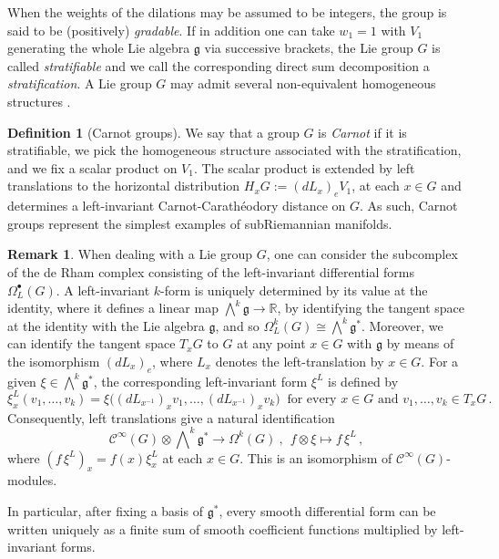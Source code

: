 \documentclass[dvipsnames]{amsart}
\theoremstyle{definition}
\newtheorem{definition}[theorem]{Definition}
\newtheorem{remark}[theorem]{Remark}
\theoremstyle{definition}
\numberwithin{equation}{section}
\newcommand{\R}{\mathbb{R}}
\begin{document}
    When the weights of the dilations may be assumed to be integers, the group is said to be (positively) \textit{gradable}. If in addition one can take $w_1=1$ with $V_{1}$  generating the whole Lie algebra $\mathfrak{g}$ via successive brackets, the Lie group $G$ is called \textit{stratifiable} and we call the corresponding direct sum decomposition a \textit{stratification}. A Lie group $G$ may admit several non-equivalent homogeneous structures \cite{hakavuori2022gradings}.
    \begin{definition}[Carnot groups]\label{def: carnot group}
    We say that a group $G$ is \textit{Carnot} if it is stratifiable, we pick the homogeneous structure associated with the stratification, and we fix a scalar product on $V_1$. The scalar
product is extended by left translations to the horizontal
distribution $H_xG:=(dL_x)_eV_1$, at each $x\in G$
and determines a left-invariant Carnot-Carath\'eodory distance on \(G\). As such, Carnot groups represent the simplest examples of subRiemannian manifolds.
\end{definition}
    \begin{remark}
        When dealing with a Lie group $G$, one can consider the subcomplex of the de Rham complex consisting of the left-invariant differential forms $\Omega_L^\bullet(G)$. A left-invariant $k$-form is uniquely determined by its value at the identity, where it defines a linear map $\bigwedge^k\mathfrak{g}\to\R$, by identifying the tangent space at the identity with the Lie algebra $\mathfrak{g}$, and so $\Omega^k_L(G)\cong\bigwedge^k\mathfrak{g}^\ast$. Moreover,  we can identify the tangent space $T_xG$ to $G$ at any point $x\in G$ with $\mathfrak{g}$ by means of the isomorphism $(dL_x)_{e}$, where $L_x$ denotes the left-translation by $x\in G$. For a given
\(\xi\in\bigwedge^k\mathfrak g^*\), the corresponding left-invariant
form \(\xi^L\) is defined by
\[
\xi_x^L(v_1,\ldots,v_k)
=
\xi\bigl(
(dL_{x^{-1}})_xv_1,\ldots,
(dL_{x^{-1}})_xv_k
\bigr)\ \text{ for every }x\in G \text{ and }v_1,\ldots,v_k\in T_xG\,.
\]
Consequently, left translations give a natural identification
\[
\mathcal C^\infty(G)\otimes
\bigwedge\nolimits^k\mathfrak g^*
\longrightarrow
\Omega^k(G)\ ,\ 
\
f\otimes\xi\longmapsto f\,\xi^L\,,
\]
where $(f\,\xi^L)_x=f(x)\xi_x^L$ at each $x\in G$.
This is an isomorphism of \(\mathcal C^\infty(G)\)-modules.



In particular, after fixing a basis of \(\mathfrak g^*\), every smooth
differential form can be written uniquely as a finite sum of smooth
coefficient functions multiplied by left-invariant forms.
    \end{remark}
\end{document}

